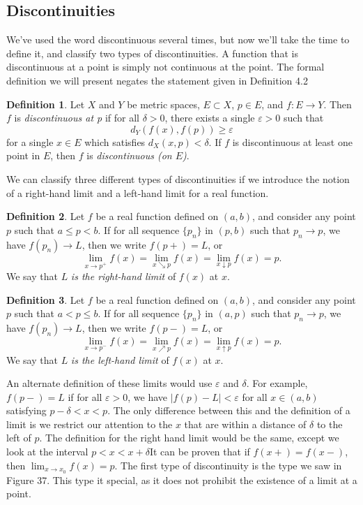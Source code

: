 \documentclass{article}
\theoremstyle{definition}
\newtheorem{definition}{Definition}[section]
\begin{document}
	\subsection{Discontinuities}
	We've used the word discontinuous several times, but now we'll take the time to define it, and classify two types of discontinuities. A function that is discontinuous at a point is simply not continuous at the point. The formal definition we will present negates the statement given in Definition 4.2
	\begin{definition}\label{def4.5}
		Let $ X $ and $ Y $ be metric spaces,  $ E\subset X $, $ p\in E $, and $ f:E\to Y $. Then $ f $ is \textit{\color{red}discontinuous at p} if for all $ \delta>0 $, there exists a single $ \varepsilon>0 $ such that $$ d_Y(f(x),f(p))\ge\varepsilon $$ for a single $ x\in E $ which satisfies $ d_X(x,p)<\delta $. If $ f $ is discontinuous at least one point in $ E $, then $ f $ is \textit{\color{red}discontinuous (on $ E $)}. 
	\end{definition}
	We can classify three different types of discontinuities if we introduce the notion of a right-hand limit and a left-hand limit for a real function. 
	\begin{definition}\label{def4.6}
		Let $ f $ be a real function defined on $ (a,b) $, and consider any point $ p $ such that $ a\le p< b $. If for all sequence $ \{p_n\} $ in $ (p,b) $ such that $ p_n\to p $, we have $ f(p_n)\to L $, then we write $f(p+)=L $, or $$\lim\limits_{x\to p^+}f(x) = \lim\limits_{x  \searrow p}f(x)= \lim\limits_{x  \downarrow p}f(x) =p. $$ We say that $ L $ \textit{\color{red}is the right-hand limit} of $ f(x) $ at $x$.
	\end{definition}
	\begin{definition}\label{def4.7}
		Let $ f $ be a real function defined on $ (a,b) $, and consider any point $ p $ such that $ a< p\le b $. If for all sequence $ \{p_n\} $ in $ (a,p) $ such that $ p_n\to p $, we have $ f(p_n)\to L $, then we write $f(p-)=L $, or $$\lim\limits_{x\to p^-}f(x) = \lim\limits_{x  \nearrow p}f(x)= \lim\limits_{x  \uparrow p}f(x) =p. $$ We say that $ L $ \textit{\color{red}is the left-hand limit} of $ f(x) $ at $x$.
	\end{definition}
	An alternate definition of these limits would use $ \varepsilon $ and $ \delta $. For example, $ f(p-)=L $ if for all $ \varepsilon>0 $, we have $|f(p)-L|<\varepsilon $ for all $ x\in(a,b) $ satisfying $ p-\delta<x<p $. The only difference between this and the definition of a limit is we restrict our attention to the $ x $ that are within a distance of $ \delta $ to the left of $ p $. The definition for the right hand limit would be the same, except we look at the interval $ p<x<x+\delta $It  can be proven that if $ f(x+)=f(x-) $, then $ \lim_{x\to x_0}f(x)=p $. The first type of discontinuity is the type we saw in Figure 37. This type it special, as it does not prohibit the existence of a limit at a point.
\end{document}
